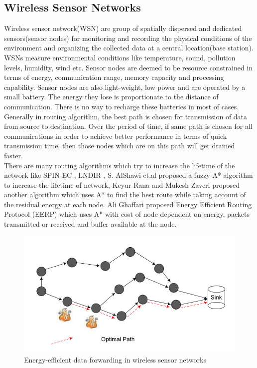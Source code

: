 \documentclass[a4paper]{article}
\begin{document}
\subsection{Wireless Sensor Networks}
Wireless sensor network(WSN) are group of spatially dispersed and dedicated sensors(sensor nodes) for monitoring and recording the physical conditions of the environment and organizing the collected data at a central location(base station). WSNs measure environmental conditions like temperature, sound, pollution levels, humidity, wind etc. Sensor nodes are deemed to be resource constrained in terms of energy, communication range, memory capacity and processing capability. Sensor nodes are also light-weight, low power and are operated by a small battery. The energy they lose is proportionate to the distance of communication. There is no way to recharge these batteries in most of cases. Generally in routing algorithm, the best path is chosen for transmission of data from source to destination. Over the period of time, if same path is chosen for all communications in order to achieve better performance in terms of quick transmission time, then those nodes which are on this path will get drained faster.\\
There are many routing algorithms which try to increase the lifetime of the network like SPIN-EC \cite{SPIN-EC}, LNDIR \cite{LNDIR}, S. AlShawi et.al \cite{WSNfuzzy} proposed a fuzzy A* algorithm to increase the lifetime of network, Keyur Rana and Mukesh Zaveri \cite{WSN2011} proposed another algorithm which uses A* to find the best route while taking account of the residual energy at each node. Ali Ghaffari \cite{WSN2014} proposed Energy Efficient Routing Protocol (EERP) which uses A* with cost of node dependent on energy, packets transmitted or received and buffer available at the node.\\
\begin{figure}[H]
    \centering
    \includegraphics[scale=0.35]{img/network.png}
    \caption{Energy-efficient data forwarding in wireless sensor networks\cite{WSN2014}}
    \label{figex_network}
\end{figure}
\end{document}
